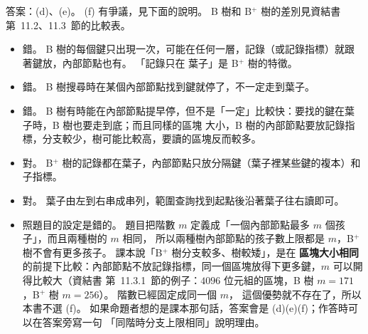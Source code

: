 \begin{pastsoln}
答案：(d)、(e)。 (f) 有爭議，見下面的說明。 B 樹和 B$^{+}$ 樹的差別見資結書第~11.2、11.3~節的比較表。

\begin{itemize}
\item[(a)] 錯。 B 樹的每個鍵只出現一次，可能在任何一層，記錄（或記錄指標）就跟著鍵放，內部節點也有。 「記錄只在
葉子」是 B$^{+}$ 樹的特徵。
\item[(b)] 錯。 B 樹搜尋時在某個內部節點找到鍵就停了，不一定走到葉子。
\item[(c)] 錯。 B 樹有時能在內部節點提早停，但不是「一定」比較快：要找的鍵在葉子時，B 樹也要走到底；而且同樣的區塊
大小，B 樹的內部節點要放記錄指標，分支較少，樹可能比較高，要讀的區塊反而較多。
\item[(d)] 對。 B$^{+}$ 樹的記錄都在葉子，內部節點只放分隔鍵（葉子裡某些鍵的複本）和子指標。
\item[(e)] 對。 葉子由左到右串成串列，範圍查詢找到起點後沿著葉子往右讀即可。
\item[(f)] 照題目的設定是錯的。 題目把階數 $m$ 定義成「一個內部節點最多 $m$ 個孩子」，而且兩種樹的 $m$ 相同，
所以兩種樹內部節點的孩子數上限都是 $m$，B$^{+}$ 樹不會有更多孩子。 課本說「B$^{+}$ 樹分支較多、樹較矮」，是在
\textbf{區塊大小相同}的前提下比較：內部節點不放記錄指標，同一個區塊放得下更多鍵，$m$ 可以開得比較大（資結書
第~11.3.1~節的例子：$4096$ 位元組的區塊，B 樹 $m = 171$，B$^{+}$ 樹 $m = 256$）。 階數已經固定成同一個 $m$，
這個優勢就不存在了，所以本書不選 (f)。 如果命題者想的是課本那句話，答案會是 (d)(e)(f)；作答時可以在答案旁寫一句
「同階時分支上限相同」說明理由。
\end{itemize}
\end{pastsoln}
